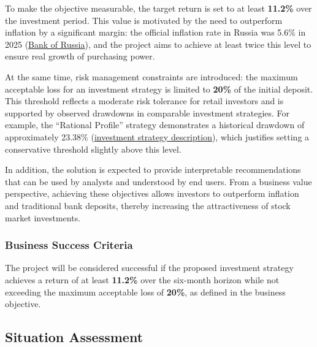 \documentclass[oneside,final,12pt,a4paper]{extreport}
\begin{document}
To make the objective measurable, the target return is set to at least \textbf{11.2\%} over the investment period. This value is motivated by the need to outperform inflation by a significant margin: the official inflation rate in Russia was 5.6\% in 2025 (\href{https://www.cbr.ru/eng/press/event/?id=28252#:~:text=Annual%20inflation%20equalled%205.6%25%20in,rate%20of%203%25%20on%20average.}{Bank of Russia}), and the project aims to achieve at least twice this level to ensure real growth of purchasing power.

At the same time, risk management constraints are introduced: the maximum acceptable loss for an investment strategy is limited to \textbf{20\%} of the initial deposit. This threshold reflects a moderate risk tolerance for retail investors and is supported by observed drawdowns in comparable investment strategies. For example, the “Rational Profile” strategy demonstrates a historical drawdown of approximately 23.38\% (\href{https://gx2invest.ru/strategies/rational}{investment strategy description}), which justifies setting a conservative threshold slightly above this level.

In addition, the solution is expected to provide interpretable recommendations that can be used by analysts and understood by end users. From a business value perspective, achieving these objectives allows investors to outperform inflation and traditional bank deposits, thereby increasing the attractiveness of stock market investments.

\subsubsection{Business Success Criteria}
The project will be considered successful if the proposed investment strategy achieves a return of at least \textbf{11.2\%} over the six-month horizon while not exceeding the maximum acceptable loss of \textbf{20\%}, as defined in the business objective.


\subsection{Situation Assessment}
\end{document}
